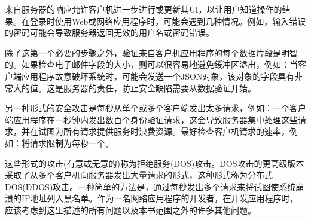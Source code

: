 来自服务器的响应允许客户机进一步进行或更新其UI，以让用户知道操作的结果。在登录时使用Web或网络应用程序时，可能会遇到几种情况。例如，输入错误的密码可能会导致服务器返回无效的用户名或密码错误。 \par
除了这第一个必要的步骤之外，验证来自客户机应用程序的每个数据片段是明智的。如果检查电子邮件字段的大小，则可以很容易地避免缓冲区溢出，例如：当客户端应用程序故意破坏系统时，可能会发送一个JSON对象，该对象的字段具有非常大的值。这是服务器的责任，防止安全缺陷需要从数据验证开始。 \par
另一种形式的安全攻击是每秒从单个或多个客户端发出太多请求，例如：一个客户端应用程序在一秒钟内发出数百个身份验证请求，这会导致服务器集中处理这些请求，并在试图为所有请求提供服务时浪费资源。最好检查客户机请求的速率，例如：将请求限制为每秒一个。 \par
这些形式的攻击(有意或无意的)称为拒绝服务(DOS)攻击。DOS攻击的更高级版本采取了从多个客户机向服务器发出大量请求的形式，这种形式称为分布式DOS(DDOS)攻击。一种简单的方法是，通过每秒发出多个请求来将试图使系统崩溃的IP地址列入黑名单。作为一名网络应用程序的开发者，在开发应用程序时，应该考虑到这里描述的所有问题以及本书范围之外的许多其他问题。 \par

